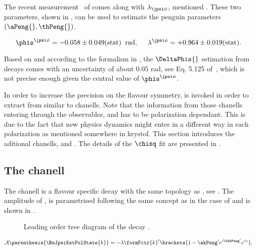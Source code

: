 The recent \lhcb measurement~\cite{phis-3fb-paper} of \phis comes along with $\lambda_{\jpsi\phi}$, mentioned .
These two parameters, shown in , can be used to estimate the penguin parameters $(\aPeng{},\thPeng{})$.

\begin{equation}
  \centering
  \phis^{\jpsi\phi}     =  -0.058 \pm 0.049(\text{stat})  \;\; \text{rad}, \;\;\;\;\;
  \lambda^{\jpsi\phi}   =  +0.964 \pm 0.019(\text{stat}).
  \label{phis_lambda_result}
\end{equation}

\noindent Based on  and according to the formalism in , the $\DeltaPhis{}$ estimation
from \BsJpsiPhi decays comes with an uncertainty of about $0.05$ rad, see Eq. 5.125 of~\cite{DeBruyn-thesis}, which is not precise
enough given the central value of $\phis^{\jpsi\phi}$.

In order to increase the precision on \DeltaPhis{} the \grpsuthree flavour symmetry,
is invoked in order to extract \DeltaPhis{} from similar to \BsJpsiPhi chanells.
Note that the information from those chanells entering through the observables,  and 
has to be polarization dependant. This is due to the fact that new physics dynamics might enter in a different way in each polarization as mentioned {\color{red}somewhere in krystof.}
This section introduces the aditional chanells, \BsJpsiKst and \BdJpsiRho. The details of the $\chisq$ fit are presented in .


\subsection{The \BsJpsiKst chanell}
\label{bsjpsikst_chanell}

The \BsJpsiKst chanell is a flavour specific decay with the same topology as \BsJpsiPhi, see .
The amplitude of \BsJpsiKst, is parametrised following the same concept as in the case of \BsJpsiPhi and is shown in .

\begin{figure}[h]
  \centering
  {\sffamily }
  \caption{Leading order tree diagram of the decay \BsJpsiPhi.}
  \label{bs2jpsikst}
\end{figure}

\begin{equation}
  \mathcal{A} \parenthesis{\BsJpsiKstPolState{k}} = -\lambda \formFctr{k}' \brackets{ 1 - \akPeng' e^{i\thkPeng'} e^{i\gamma} },
  \label{bsjpsikst_amp}
\end{equation}


